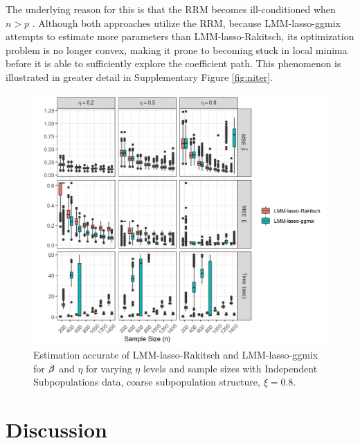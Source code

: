 The underlying reason for this is that the RRM becomes ill-conditioned when $n > p$ \citep{ledoit2004well}. Although both approaches utilize the RRM, because LMM-lasso-ggmix attempts to estimate more parameters than LMM-lasso-Rakitsch, its optimization problem is no longer convex, making it prone to becoming stuck in local minima before it is able to sufficiently explore the coefficient path. This phenomenon is illustrated in greater detail in Supplementary Figure \ref{fig:niter}.

\begin{figure}[H]
    \centering
    \includegraphics[width = \textwidth]{figures/eta_beta_hat.png}
     \caption{Estimation accurate of LMM-lasso-Rakitsch and LMM-lasso-ggmix for $\boldsymbol{\beta}{}$ and $\eta$ for varying $\eta$ levels and sample sizes with Independent Subpopulations data, coarse subpopulation structure, $\xi = 0.8$.}
    \label{fig:eta_beta_mse}
\end{figure}

\section{Discussion} \label{sec:discussion}

